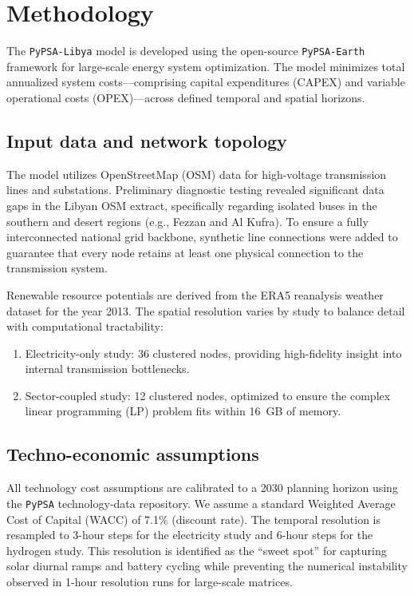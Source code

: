 \documentclass[preprint,12pt]{elsarticle}
\begin{document}

\section{Methodology}
\label{sec:methodology}

The \texttt{PyPSA-Libya} model is developed using the open-source \texttt{PyPSA-Earth} framework for large-scale energy system optimization. The model minimizes total annualized system costs—comprising capital expenditures (CAPEX) and variable operational costs (OPEX)—across defined temporal and spatial horizons.

\subsection{Input data and network topology}
The model utilizes OpenStreetMap (OSM) data for high-voltage transmission lines and substations. Preliminary diagnostic testing revealed significant data gaps in the Libyan OSM extract, specifically regarding isolated buses in the southern and desert regions (e.g., Fezzan and Al Kufra). To ensure a fully interconnected national grid backbone, synthetic line connections were added to guarantee that every node retains at least one physical connection to the transmission system.

Renewable resource potentials are derived from the ERA5 reanalysis weather dataset for the year 2013. The spatial resolution varies by study to balance detail with computational tractability:
\begin{enumerate}
    \item {Electricity-only study:} 36 clustered nodes, providing high-fidelity insight into internal transmission bottlenecks.
    \item {Sector-coupled study:} 12 clustered nodes, optimized to ensure the complex linear programming (LP) problem fits within 16~GB of memory.
\end{enumerate}

\subsection{Techno-economic assumptions}
All technology cost assumptions are calibrated to a 2030 planning horizon using the \texttt{PyPSA} technology-data repository. We assume a standard Weighted Average Cost of Capital (WACC) of 7.1\% (discount rate). The temporal resolution is resampled to 3-hour steps for the electricity study and 6-hour steps for the hydrogen study. This resolution is identified as the ``sweet spot'' for capturing solar diurnal ramps and battery cycling while preventing the numerical instability observed in 1-hour resolution runs for large-scale matrices.
\end{document}
